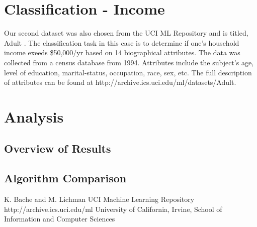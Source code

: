 \documentclass{sig-alternate}
\begin{document}
\section{Classification - Income}

Our second dataset was also chosen from the UCI ML Repository and is titled, Adult \cite{Bache+Lichman:2013}. The classification task in this case is to determine if one's household income exeeds \$50,000/yr based on 14 biographical attributes. The data was collected from a census database from 1994. Attributes include the subject's age, level of education, marital-status, occupation, race, sex, etc. The full description of attributes can be found at http://archive.ics.uci.edu/ml/datasets/Adult.



\section{Analysis}

\subsection{Overview of Results}

\subsection{Algorithm Comparison}





\begin{thebibliography}{10}

K. Bache and M. Lichman
\newblock UCI Machine Learning Repository
\newblock http://archive.ics.uci.edu/ml
\newblock University of California, Irvine, School of Information and Computer Sciences


\end{thebibliography}
\end{document}

